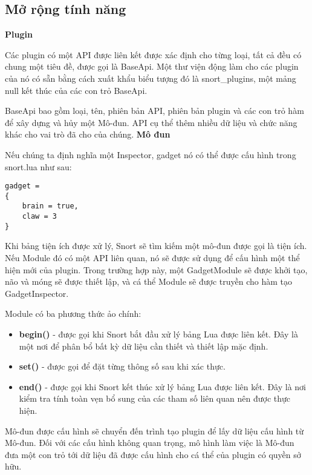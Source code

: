 \subsection{Mở rộng tính năng}
\textbf{Plugin}
\par
Các plugin có một API được liên kết được xác định cho từng loại, tất cả đều có chung một tiêu đề, được gọi là BaseApi. 
Một thư viện động làm cho các plugin của nó có sẵn bằng cách xuất khẩu biểu tượng đó là snort\_plugins, một mảng null kết thúc của các con trỏ BaseApi.
\par
BaseApi bao gồm loại, tên, phiên bản API, phiên bản plugin và các con trỏ hàm để xây dựng và hủy một Mô-đun. API cụ thể thêm nhiều dữ liệu và chức năng khác cho vai trò đã cho của chúng.
\newline
\newline
\textbf{Mô đun}
\par
Nếu chúng ta định nghĩa một Inspector, gadget nó có thể được cấu hình trong snort.lua như sau:
\begin{lstlisting}
gadget =
{
    brain = true,
    claw = 3
}
\end{lstlisting}
\par
Khi bảng tiện ích được xử lý, Snort sẽ tìm kiếm một mô-đun được gọi là tiện ích. Nếu Module đó có một API liên quan, nó sẽ được sử dụng để cấu hình một thể hiện mới của plugin. 
Trong trường hợp này, một GadgetModule sẽ được khởi tạo, não và móng sẽ được thiết lập, và cá thể Module sẽ được truyền cho hàm tạo GadgetInspector.
\par
Module có ba phương thức ảo chính:
\begin{itemize}
\item \textbf{begin()} - được gọi khi Snort bắt đầu xử lý bảng Lua được liên kết. Đây là một nơi để phân bổ bất kỳ dữ liệu cần thiết và thiết lập mặc định.

\item \textbf{set()} - được gọi để đặt từng thông số sau khi xác thực.

\item \textbf{end()} - được gọi khi Snort kết thúc xử lý bảng Lua được liên kết. Đây là nơi kiểm tra tính toàn vẹn bổ sung của các tham số liên quan nên được thực hiện.
\end{itemize}
\par
Mô-đun được cấu hình sẽ chuyển đến trình tạo plugin để lấy dữ liệu cấu hình từ Mô-đun. 
Đối với các cấu hình không quan trọng, mô hình làm việc là Mô-đun đưa một con trỏ tới dữ liệu đã được cấu hình cho cá thể của plugin có quyền sở hữu.
